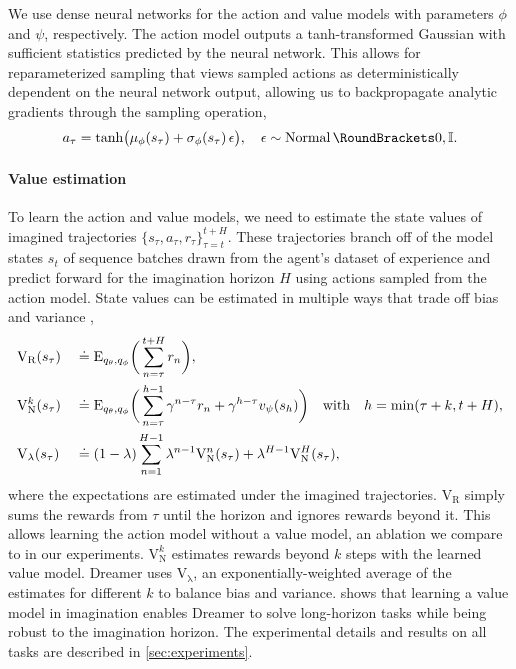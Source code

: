 We use dense neural networks for the action and value models with parameters $\phi$ and $\psi$, respectively. The action model outputs a tanh-transformed Gaussian \citep{haarnoja2018sac} with sufficient statistics predicted by the neural network. This allows for reparameterized sampling \citep{kingma2013vae,rezende2014vae} that views sampled actions as deterministically dependent on the neural network output, allowing us to backpropagate analytic gradients through the sampling operation,
\begin{equation}
a_\tau=\operatorname{tanh}\!\big(\mu_\phi(s_\tau)+\sigma_\phi(s_\tau)\,\epsilon\big),
\quad\epsilon\sim\Normal(0,\I).
\end{equation}%

\paragraph{Value estimation}

To learn the action and value models, we need to estimate the state values of imagined trajectories $\{s_\tau,a_\tau,r_\tau\}_{\tau=t}^{t+H}$. These trajectories branch off of the model states $s_t$ of sequence batches drawn from the agent's dataset of experience and predict forward for the imagination horizon $H$ using actions sampled from the action model. State values can be estimated in multiple ways that trade off bias and variance \citep{sutton2018rl},
\begin{alignat}{3}
&\mathrm{V}_{\mathrm{R}}(s_\tau)&&\defined\E[\bigg]{q_\theta,q_\phi}{
    \sum_{n=\tau}^{t+H} r_n}, \\
&\mathrm{V}_{\mathrm{N}}^k(s_\tau)&&\defined\E[\bigg]{q_\theta,q_\phi}{
    \sum_{n=\tau}^{h-1} \gamma^{n-\tau}r_n
    +\gamma^{h-\tau} v_\psi(s_h)} \quad\text{with}\quad h=\min(\tau+k,t+H), \\
&\mathrm{V}_{\mathrm{\lambda}}(s_\tau)&&\defined
    (1-\lambda) \sum_{n=1}^{H-1} \lambda^{n-1} \mathrm{V}_{\mathrm{N}}^n(s_\tau) + \lambda^{H-1}\mathrm{V}_{\mathrm{N}}^H(s_\tau),
\label{eq:lambda_value}
\end{alignat}%
where the expectations are estimated under the imagined trajectories. $\mathrm{V}_{\mathrm{R}}$ simply sums the rewards from $\tau$ until the horizon and ignores rewards beyond it. This allows learning the action model without a value model, an ablation we compare to in our experiments. $\mathrm{V}_{\mathrm{N}}^k$ estimates rewards beyond $k$ steps with the learned value model. Dreamer uses $\mathrm{V}_{\mathrm{\lambda}}$, an exponentially-weighted average of the estimates for different $k$ to balance bias and variance.  shows that learning a value model in imagination enables Dreamer to solve long-horizon tasks while being robust to the imagination horizon. The experimental details and results on all tasks are described in \cref{sec:experiments}.

